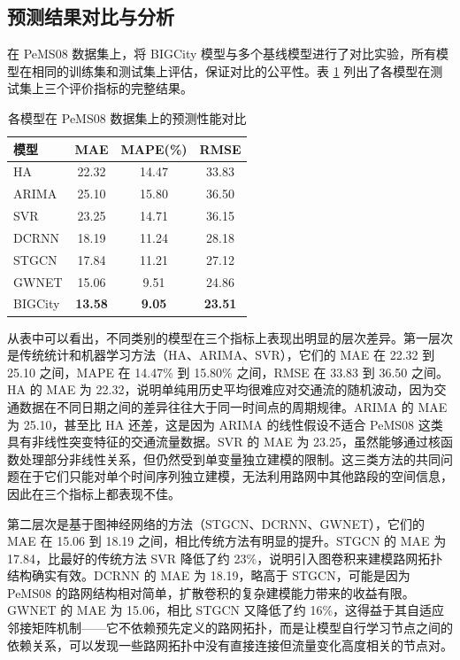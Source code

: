 \subsection{预测结果对比与分析}

在 PeMS08 数据集上，将 BIGCity 模型与多个基线模型进行了对比实验，所有模型在相同的训练集和测试集上评估，保证对比的公平性。表 \ref{tab:prediction-comparison} 列出了各模型在测试集上三个评价指标的完整结果。

\begin{table}[!htbp]
\centering
\caption{各模型在 PeMS08 数据集上的预测性能对比}
\label{tab:prediction-comparison}
\begin{tabular}{lccc}
\toprule
\textbf{模型} & \textbf{MAE} & \textbf{MAPE(\%)} & \textbf{RMSE} \\
\midrule
HA & 22.32 & 14.47 & 33.83 \\
ARIMA & 25.10 & 15.80 & 36.50 \\
SVR & 23.25 & 14.71 & 36.15 \\
DCRNN & 18.19 & 11.24 & 28.18 \\
STGCN & 17.84 & 11.21 & 27.12 \\
GWNET & 15.06 & 9.51 & 24.86 \\
\midrule
BIGCity & \textbf{13.58} & \textbf{9.05} & \textbf{23.51} \\
\bottomrule
\end{tabular}
\end{table}

从表中可以看出，不同类别的模型在三个指标上表现出明显的层次差异。第一层次是传统统计和机器学习方法（HA、ARIMA、SVR），它们的 MAE 在 22.32 到 25.10 之间，MAPE 在 14.47\% 到 15.80\% 之间，RMSE 在 33.83 到 36.50 之间。HA 的 MAE 为 22.32，说明单纯用历史平均很难应对交通流的随机波动，因为交通数据在不同日期之间的差异往往大于同一时间点的周期规律。ARIMA 的 MAE 为 25.10，甚至比 HA 还差，这是因为 ARIMA 的线性假设不适合 PeMS08 这类具有非线性突变特征的交通流量数据。SVR 的 MAE 为 23.25，虽然能够通过核函数处理部分非线性关系，但仍然受到单变量独立建模的限制。这三类方法的共同问题在于它们只能对单个时间序列独立建模，无法利用路网中其他路段的空间信息，因此在三个指标上都表现不佳。

第二层次是基于图神经网络的方法（STGCN、DCRNN、GWNET），它们的 MAE 在 15.06 到 18.19 之间，相比传统方法有明显的提升。STGCN 的 MAE 为 17.84，比最好的传统方法 SVR 降低了约 23\%，说明引入图卷积来建模路网拓扑结构确实有效。DCRNN 的 MAE 为 18.19，略高于 STGCN，可能是因为 PeMS08 的路网结构相对简单，扩散卷积的复杂建模能力带来的收益有限。GWNET 的 MAE 为 15.06，相比 STGCN 又降低了约 16\%，这得益于其自适应邻接矩阵机制——它不依赖预先定义的路网拓扑，而是让模型自行学习节点之间的依赖关系，可以发现一些路网拓扑中没有直接连接但流量变化高度相关的节点对。

